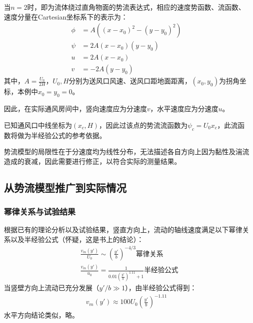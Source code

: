 当$n=2$时，即为流体绕过直角物面的势流表达式，相应的速度势函数、流函数、速度分量在Cartesian坐标系下的表示为：
\begin{align}
        \phi &= A((x-x_{0})^2-(y-y_{0})^2)\\
        \psi &= 2A(x-x_{0})(y-y_{0})\\
        u &= 2A(x-x_{0})\\
        v &= -2A(y-y_{0})
\end{align}
其中，$A=\frac{U_{0}}{2H}$，$U_{0},H$分别为送风口风速、送风口距地面距离，$(x_{0},y_{0})$为拐角坐标，本例中$x_{0}=y_{0}=0$。

因此，在实际通风房间中，竖向速度应为分速度$v$，水平速度应为分速度$u$。

已知通风口中线坐标为$(x_{c}, H)$，因此过该点的势流流函数为$\psi_{c}=U_{0}x_{c}$，此流函数将做为半经验公式的参考依据。

势流模型的局限性在于分速度均为线性分布，无法描述各自方向上因为黏性及湍流造成的衰减，因此需要进行修正，以符合实际的测量结果。

\subsection{从势流模型推广到实际情况}
\subsubsection{幂律关系与试验结果}
根据已有的理论分析以及试验结果，竖直方向上，流动的轴线速度满足以下幂律关系以及半经验公式（怀疑，这是书上的结论）：
\begin{align*}
    &\frac{v_{m}(y')}{U_{0}}\sim \left(\frac{y'}{b}\right)^{-4/3}\text{幂律关系}\\
    &\frac{v_{m}(y')}{u_{0}}=\frac{1}{0.01(\frac{y'}{b})^{1.11}+1}\text{半经验公式}
\end{align*}
当竖壁方向上流动已充分发展（$y'/b\gg 1$），由半经验公式得到：
\begin{align*}
    v_{m}(y')\approx 100U_{0}(\frac{y'}{b})^{-1.11}
\end{align*}
水平方向结论类似，略。

